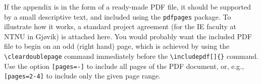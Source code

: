 If the appendix is in the form of a ready-made PDF file, it should be supported by a small descriptive text, and included using the \texttt{pdfpages} package. To illustrate how it works, a standard project agreement (for the IE faculty at NTNU in Gjøvik) is attached here. You would probably want the included PDF file to begin on an odd (right hand) page, which is achieved by using the \texttt{\textbackslash cleardoublepage} command immediately before the \texttt{\textbackslash includepdf[]\{\}} command. Use the option \texttt{[pages=-]} to include all pages of the PDF document, or, e.g., \texttt{[pages=2-4]} to include only the given page range.

\cleardoublepage
